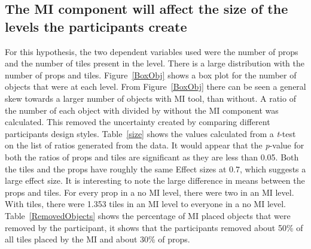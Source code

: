 \documentclass[journal]{IEEEtran}
\begin{document}
\subsection{The MI component will affect the size of the levels the participants create}\label{sizeSec}
For this hypothesis, the two dependent variables used were the number of props and the number of tiles present in the level. There is a large distribution with the number of props and tiles. Figure~\ref{BoxObj} shows a box plot for the number of objects that were at each level. From Figure~\ref{BoxObj} there can be seen a general skew towards a larger number of objects with MI tool, than without. A ratio of the number of each object with divided by without the MI component was calculated. This removed the uncertainty created by comparing different participants design styles. Table~\ref{size} shows the values calculated from a \textit{t}-test on the list of ratios generated from the data. It would appear that the \textit{p}-value for both the ratios of props and tiles are significant as they are less than 0.05. Both the tiles and the props have roughly the same Effect sizes at 0.7, which suggests a large effect size\cite{cohen1988statistical}. It is interesting to note the large difference in means between the props and tiles. For every prop in a no MI level, there were two in an MI level. With tiles, there were 1.353 tiles in an MI level to everyone in a no MI level. Table~\ref{RemovedObjects} shows the percentage of MI placed objects that were removed by the participant, it shows that the participants removed about 50\% of all tiles placed by the MI and about 30\% of props.
\end{document}
